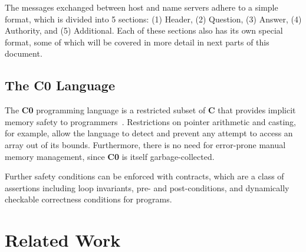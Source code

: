 \documentclass{article}
\newcommand\Kwd[1]{{\sffamily\bfseries{#1}}}
\begin{document}
The messages exchanged between host and name servers adhere to a
simple format, which is divided into 5 sections: (1) Header, (2)
Question, (3) Answer, (4) Authority, and (5) Additional.  Each of
these sections also has its own special format, some of which will be
covered in more detail in next parts of this document.


\subsection*{The \Kwd{C0} Language}\label{sec:c0}

The \Kwd{C0} programming language is a restricted subset of \Kwd{C}
that provides implicit memory safety to
programmers~\citep{pfenning:c0-reference}. Restrictions on pointer
arithmetic and casting, for example, allow the language to detect and
prevent any attempt to access an array out of its bounds. Furthermore,
there is no need for error-prone manual memory management, since
\Kwd{C0} is itself garbage-collected.

Further safety conditions can be enforced with contracts, which are a
class of assertions including loop invariants, pre- and
post-conditions, and dynamically checkable correctness conditions for
programs.





\section{Related Work}
\end{document}
